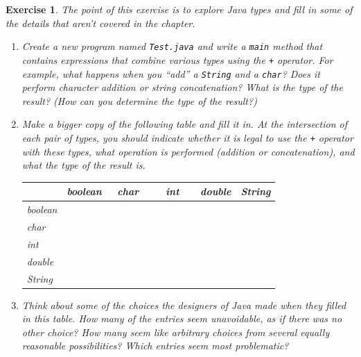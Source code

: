 \documentclass[12pt]{book}
\theoremstyle{exercise}
\newtheorem{exercise}{Exercise}[chapter]
\newcommand{\java}[1]{\verb"#1"}
\begin{document}
\begin{exercise}

The point of this exercise is to explore Java types and fill in some of the details that aren't covered in the chapter.



\begin{enumerate}

\item Create a new program named {\tt Test.java} and write a \java{main} method that contains expressions that combine various types using the \java{+} operator.
For example, what happens when you ``add'' a \java{String} and a \java{char}?
Does it perform character addition or string concatenation?
What is the type of the result?
(How can you determine the type of the result?)

\item Make a bigger copy of the following table and fill it in.
At the intersection of each pair of types, you should indicate whether it is legal to use the \java{+} operator with these types, what operation is performed (addition or concatenation), and what the type of the result is.

\begin{center}
\begin{tabular}{|l|l|l|l|l|l|} \hline
        &  boolean  &  ~char~  &  ~~int~~  &  double  &  String \\ \hline
boolean &           &          &           &          &         \\ \hline
char    &           &          &           &          &         \\ \hline
int     &           &          &           &          &         \\ \hline
double  &           &          &           &          &         \\ \hline
String  &           &          &           &          &         \\ \hline
\end{tabular}
\end{center}

\item Think about some of the choices the designers of Java made when they filled in this table.
How many of the entries seem unavoidable, as if there was no other choice?
How many seem like arbitrary choices from several equally reasonable possibilities?
Which entries seem most problematic?


\end{enumerate}
\end{exercise}
\end{document}
